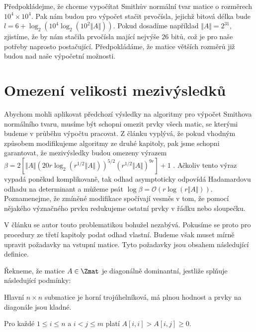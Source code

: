 Předpokládejme, že chceme vypočítat Smithův normální tvar matice o rozměrech
$ 10^4 \times 10^4 $. Pak nám budou pro výpočet stačit prvočísla, jejichž bitová
délka bude $ l = 6 + \log_2(10^4 \log_2(10^2 \Vert A \Vert)) $. Pokud dosadíme
například $ \Vert A \Vert = 2^{31} $, zjistíme, že by nám stačila prvočísla
mající nejvýše $ 26 $ bitů, což je pro naše potřeby naprosto
postačující. Předpokládáme, že matice větších rozměrů již budou nad naše výpočetní
možnosti.



\section{Omezení velikosti mezivýsledků}
Abychom mohli aplikovat předchozí výsledky na algoritmy pro výpočet Smithova
normálního tvaru, musíme být schopni omezit prvky všech matic, se kterými
budeme v průběhu výpočtu pracovat. Z článku \cite{triang} vyplývá, že pokud
vhodným způsobem modifikujeme algoritmy ze druhé kapitoly, pak jsme schopni
garantovat, že mezivýsledky budou omezeny výrazem
$ \beta = 2[\Vert A \Vert (20 r \log_2{ (r^{1/2} \Vert A \Vert) })^{5/2} (r^{1/2} \Vert A \Vert)^{9 r} ] + 1 $
\cite[Theorem 16]{triang}.
Ačkoliv tento výraz vypadá poněkud komplikovaně, tak odhad
asymptoticky odpovídá Hadamardovu odhadu na determinant a můžeme psát
$ \log{\beta} = \mathcal{O}(r \log{(r \Vert A \Vert)}) $.
Poznamenejme, že zmíněné modifikace spočívají vesměs v tom, že pomocí nějakého
význačného prvku redukujeme ostatní prvky v řádku nebo sloupečku.

V článku \cite{SNF_Arne} se autor touto problematikou bohužel nezabývá. Pokusíme
se proto pro procedury ze třetí kapitoly podat odhad vlastní. Budeme však muset
mírně upravit požadavky na vstupní matice. Tyto požadavky jsou obsahem následující
definice.

\begin{defi}
    Řekneme, že matice $ A \in \Zmat $ je diagonálně dominantní, jestliže
    splňuje následující podmínky:
    \begin{Cond}
        \item Hlavní $ n \times n $ submatice je horní trojúhelníková, má plnou
            hodnost a prvky na diagonále jsou kladné.
        \item Pro každé $ 1 \leq i \leq n $ a $ i < j \leq m $ platí $ A[i, i] > A[i, j] \geq 0 $.
    \end{Cond}
\end{defi}

